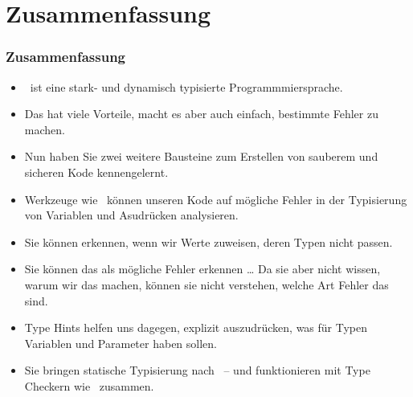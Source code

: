 \documentclass[aspectratio=169,mathserif,notheorems]{beamer}%
\begin{document}
\section{Zusammenfassung}%
%
\begin{frame}%
\frametitle{Zusammenfassung}%
\begin{itemize}%
%
\item \python\ ist eine stark- und dynamisch typisierte Programmmiersprache.%
%
\item<2-> Das hat viele Vorteile, macht es aber auch einfach, bestimmte Fehler zu machen.%
%
\item<3-> Nun haben Sie zwei weitere Bausteine zum Erstellen von sauberem und sicheren Kode kennengelernt.%
%
\item<4-> Werkzeuge wie \mypy\ können unseren Kode auf mögliche Fehler in der Typisierung von Variablen und Asudrücken analysieren.%
%
\item<5-> Sie können erkennen, wenn wir Werte zuweisen, deren Typen nicht passen.%
%
\item<6-> Sie können das als mögliche Fehler erkennen {\dots} Da sie aber nicht wissen, warum wir das machen, können sie nicht verstehen, welche Art Fehler das sind.%
%
\item<7-> Type Hints helfen uns dagegen, explizit auszudrücken, was für Typen Variablen und Parameter haben sollen.%
%
\item<8-> Sie bringen statische Typisierung nach \python\ -- und funktionieren mit Type Checkern wie \mypy\ zusammen.%
\end{itemize}%
\end{frame}%
%
\endPresentation%
\end{document}
